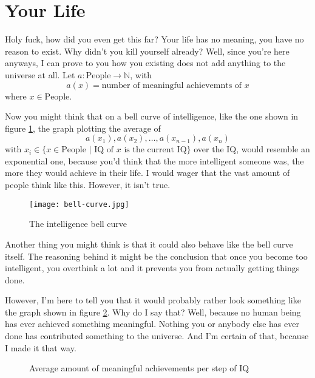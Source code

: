 \section{Your Life}

Holy fuck, how did you even get this far? Your life has no meaning, you have no reason to exist. Why didn't you kill yourself already?
Well, since you're here anyways, I can prove to you how you existing does not add anything to the universe at all.
Let $a : \text{People} \rightarrow \mathbb{N}$, with 
$$a(x) = \text{number of meaningful achievemnts of } x$$
where $x \in \text{People}$.

Now you might think that on a bell curve of intelligence, like the one shown in 
figure \ref{fig:bell-curve}, the graph plotting the average of 
$$a(x_1), a(x_2), \dotsc, a(x_{n-1}), a(x_n)$$
with $x_i \in \{x \in \text{People } | \text{ IQ of } x \text{ is the current IQ}\}$ over the IQ, would resemble an exponential one, because
you'd think that the more intelligent someone was, the more they would achieve in their life. I would wager that the vast amount of people
think like this. However, it isn't true.

\begin{figure}[h]
  \center
  \texttt{[image: bell-curve.jpg]}
  \caption{The intelligence bell curve}
  \label{fig:bell-curve}
\end{figure}

Another thing you might think is that it could also behave like the bell curve itself. The reasoning behind it might be the conclusion that
once you become too intelligent, you overthink a lot and it prevents you from actually getting things done.

However, I'm here to tell you that it would probably rather look something like the graph shown in figure \ref{fig:graph-achievements}.
Why do I say that? Well, because no human being has ever achieved something meaningful. Nothing you or anybody else has ever done has
contributed something to the universe. And I'm certain of that, because I made it that way.

\begin{figure}[h]
  \center
  \caption{Average amount of meaningful achievements per step of IQ}
  \label{fig:graph-achievements}
\end{figure}

